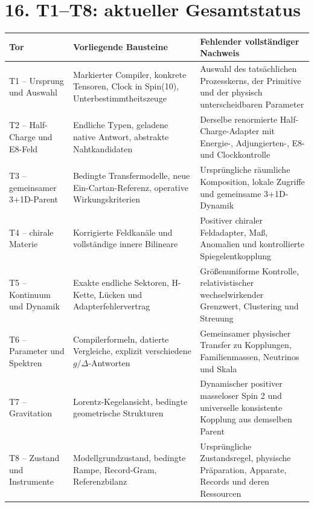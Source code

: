 \section{16. T1--T8: aktueller
Gesamtstatus}\label{t1t8-aktueller-gesamtstatus}

{\def\LTcaptype{none} %
\begin{longtable}[]{@{}
  >{\raggedright\arraybackslash}p{}
  >{\raggedright\arraybackslash}p{}
  >{\raggedright\arraybackslash}p{}@{}}
\toprule\noalign{}
\begin{minipage}[b]{\linewidth}\raggedright
Tor
\end{minipage} & \begin{minipage}[b]{\linewidth}\raggedright
Vorliegende Bausteine
\end{minipage} & \begin{minipage}[b]{\linewidth}\raggedright
Fehlender vollständiger Nachweis
\end{minipage} \\
\midrule\noalign{}
\endhead
\bottomrule\noalign{}
\endlastfoot
T1 -- Ursprung und Auswahl & Markierter Compiler, konkrete Tensoren,
Clock in Spin(10), Unterbestimmtheitszeuge & Auswahl des tatsächlichen
Prozesskerns, der Primitive und der physisch unterscheidbaren
Parameter \\
T2 -- Half-Charge und E8-Feld & Endliche Typen, geladene native Antwort,
abstrakte Nahtkandidaten & Derselbe renormierte Half-Charge-Adapter mit
Energie-, Adjungierten-, E8- und Clockkontrolle \\
T3 -- gemeinsamer 3+1D-Parent & Bedingte Transfermodelle, neue
Ein-Cartan-Referenz, operative Wirkungskriterien & Ursprüngliche
räumliche Komposition, lokale Zugriffe und gemeinsame 3+1D-Dynamik \\
T4 -- chirale Materie & Korrigierte Feldkanäle und vollständige innere
Bilineare & Positiver chiraler Feldadapter, Maß, Anomalien und
kontrollierte Spiegelentkopplung \\
T5 -- Kontinuum und Dynamik & Exakte endliche Sektoren, H-Kette, Lücken
und Adapterfehlervertrag & Größenuniforme Kontrolle, relativistischer
wechselwirkender Grenzwert, Clustering und Streuung \\
T6 -- Parameter und Spektren & Compilerformeln, datierte Vergleiche,
explizit verschiedene \(g/\Delta\)-Antworten & Gemeinsamer physischer
Transfer zu Kopplungen, Familienmassen, Neutrinos und Skala \\
T7 -- Gravitation & Lorentz-Kegelansicht, bedingte geometrische
Strukturen & Dynamischer positiver masseloser Spin 2 und universelle
konsistente Kopplung aus demselben Parent \\
T8 -- Zustand und Instrumente & Modellgrundzustand, bedingte Rampe,
Record-Gram, Referenzbilanz & Ursprüngliche Zustandsregel, physische
Präparation, Apparate, Records und deren Ressourcen \\
\end{longtable}
}

